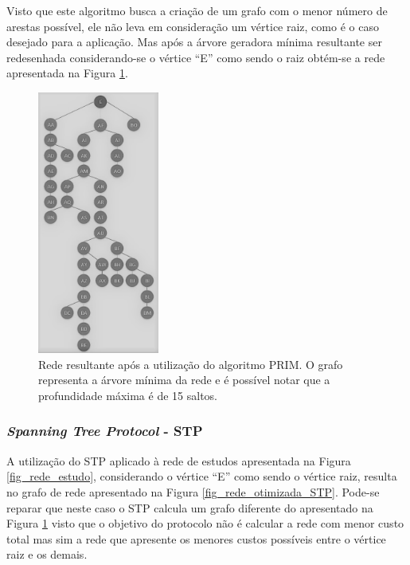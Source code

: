 \documentclass[12pt]{article}
\begin{document}
Visto que este algoritmo busca a criação de um grafo com o menor número de arestas possível, ele não leva em consideração um vértice raiz, como é o caso desejado para a aplicação. Mas após a árvore geradora mínima resultante ser redesenhada considerando-se o vértice ``E'' como sendo o raiz obtém-se a rede apresentada na Figura \ref{fig_rede_otimizada_prim}.

\begin{figure}[ht] %
	\centering
	\includegraphics[width=4cm]{Otimizada_Prim_PB}
	\caption{Rede resultante após a utilização do algoritmo PRIM. O grafo representa a árvore mínima da rede e é possível notar que a profundidade máxima é de 15 saltos.}
	\label{fig_rede_otimizada_prim}
\end{figure}

\subsubsection{\emph{Spanning Tree Protocol} - STP}
A utilização do STP aplicado à rede de estudos apresentada na Figura \ref{fig_rede_estudo}, considerando o vértice ``E'' como sendo o vértice raiz, resulta no grafo de rede apresentado na Figura \ref{fig_rede_otimizada_STP}. Pode-se reparar que neste caso o STP calcula um grafo diferente do apresentado na Figura \ref{fig_rede_otimizada_prim} visto que o objetivo do protocolo não é calcular a rede com menor custo total mas sim a rede que apresente os menores custos possíveis entre o vértice raiz e os demais.
\end{document}

